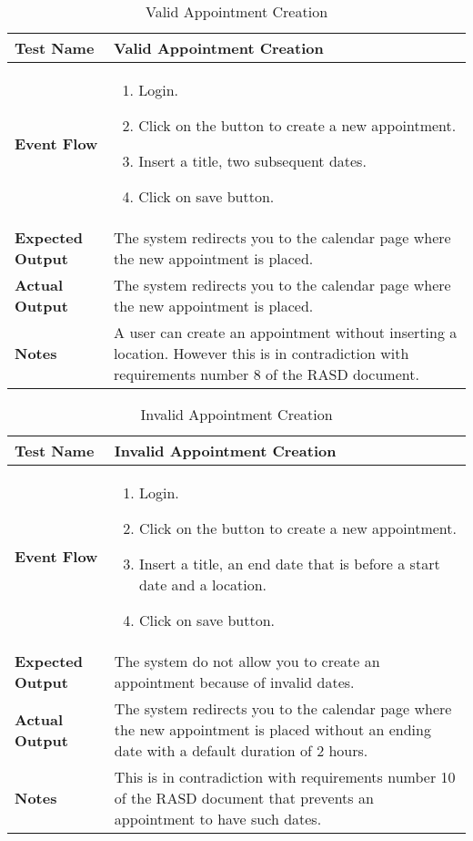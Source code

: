 \begin{table}[h]	
\centering
\def\arraystretch{1.5}
\begin{tabular}{|m{7cm}|m{7cm}|}
	\hline
	\textbf{Test Name}            & Valid Appointment Creation   \\ \hline
	\textbf{Event Flow}             & 
	 	\begin{enumerate}
	 	\item Login.
	 	\item Click on the button to create a new appointment.
	 	\item Insert a title, two subsequent dates.
	 	\item Click on save button.
	 \end{enumerate} \\ \hline
	\textbf{Expected Output}  &  The system redirects you to the calendar page where the new appointment is placed.   \\ \hline
	\textbf{Actual Output}       & The system redirects you to the calendar page where the new appointment is placed.    \\ \hline
	\textbf{Notes} & A user can create an appointment without inserting a location. However this is in contradiction with requirements number 8 of the RASD document. \\ \hline
\end{tabular}
\caption{Valid Appointment Creation}
\end{table}


\begin{table}[h]	
	\centering
	\def\arraystretch{1.5}
	\begin{tabular}{|m{7cm}|m{7cm}|}
		\hline
		\textbf{Test Name}            & Invalid Appointment Creation   \\ \hline
		\textbf{Event Flow}             & 
		\begin{enumerate}
			\item Login.
			\item Click on the button to create a new appointment.
			\item Insert a title, an end date that is before a start date and a location.
			\item Click on save button.
		\end{enumerate} \\ \hline
		\textbf{Expected Output}  &  The system do not allow you to create an appointment because of invalid dates.   \\ \hline
		\textbf{Actual Output}       & The system redirects you to the calendar page where the new appointment is placed without an ending date with a default duration of 2 hours.    \\ \hline
		\textbf{Notes} & This is in contradiction with requirements number 10 of the RASD document that prevents an appointment to have such dates. \\ \hline
	\end{tabular}
	\caption{Invalid Appointment Creation}
\end{table}


